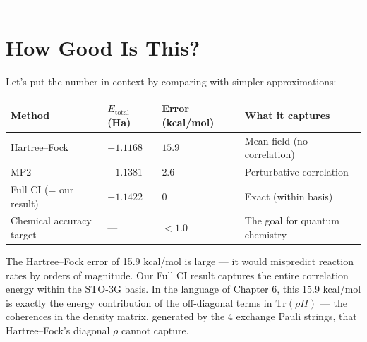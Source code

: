 \documentclass[
  11pt,
  oneside]{book}
\begin{document}
\begin{center}\rule{0.5\linewidth}{0.5pt}\end{center}

\section{How Good Is This?}\label{how-good-is-this}

Let's put the number in context by comparing with simpler
approximations:

\begin{longtable}[]{@{}
  >{\raggedright\arraybackslash}p{}
  >{\centering\arraybackslash}p{}
  >{\centering\arraybackslash}p{}
  >{\raggedright\arraybackslash}p{}@{}}
\toprule\noalign{}
\begin{minipage}[b]{\linewidth}\raggedright
Method
\end{minipage} & \begin{minipage}[b]{\linewidth}\centering
\(E_\text{total}\) (Ha)
\end{minipage} & \begin{minipage}[b]{\linewidth}\centering
Error (kcal/mol)
\end{minipage} & \begin{minipage}[b]{\linewidth}\raggedright
What it captures
\end{minipage} \\
\midrule\noalign{}
\endhead
\bottomrule\noalign{}
\endlastfoot
Hartree--Fock & \(-1.1168\) & \(15.9\) & Mean-field (no correlation) \\
MP2 & \(-1.1381\) & \(2.6\) & Perturbative correlation \\
Full CI (= our result) & \(-1.1422\) & \(0\) & Exact (within basis) \\
Chemical accuracy target & --- & \(< 1.0\) & The goal for quantum
chemistry \\
\end{longtable}

The Hartree--Fock error of 15.9 kcal/mol is large --- it would
mispredict reaction rates by orders of magnitude. Our Full CI result
captures the entire correlation energy within the STO-3G basis. In the
language of Chapter 6, this 15.9 kcal/mol is exactly the energy
contribution of the off-diagonal terms in \(\text{Tr}(\rho H)\) --- the
coherences in the density matrix, generated by the 4 exchange Pauli
strings, that Hartree--Fock's diagonal \(\rho\) cannot capture.
\end{document}
